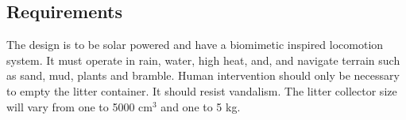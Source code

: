 \subsection{Requirements}

The design is to be solar powered and have a biomimetic inspired locomotion system.
It must operate in rain, water, high heat, and, and navigate terrain such as sand, mud, plants and bramble.
Human intervention should only be necessary to empty the litter container.
It should resist vandalism.
The litter collector size will vary from one to 5000 cm$^3$ and one to 5 kg.